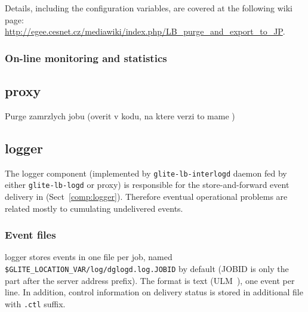 Details, including the configuration variables, are covered at the following
wiki page:
\url{http://egee.cesnet.cz/mediawiki/index.php/LB_purge_and_export_to_JP}.

\subsubsection{On-line monitoring and statistics}




\subsection{\LB proxy}

Purge zamrzlych jobu (overit v kodu, na ktere verzi to mame )


\subsection{\LB logger}

\iffalse
\TODO{ljocha}

Karantena (od ktere verze to mame?)
- kdyz se nepodari rozparsovat soubor
- client/examples -- parse-logevent-file??, lze pouzit

Cistky pri zaseknuti, nesmyslna jobid apod.

Debugovaci rezim

Notifikacni IL
\fi

The logger component (implemented by \verb'glite-lb-interlogd' daemon fed by
either \verb'glite-lb-logd' or \LB proxy)
is responsible for the store-and-forward event delivery in \LB
(Sect~\ref{comp:logger}).
Therefore eventual operational problems are related mostly to 
cumulating undelivered events.

\subsubsection{Event files}

\LB logger stores events in one file per job, named
\verb'$GLITE_LOCATION_VAR/log/dglogd.log.JOBID' by default
(JOBID is only the part after the \LB server address prefix).
The format is text (ULM~\cite{ulm}), one event per line.
In addition, control information on delivery status is stored in additional
file with \verb'.ctl' suffix.

